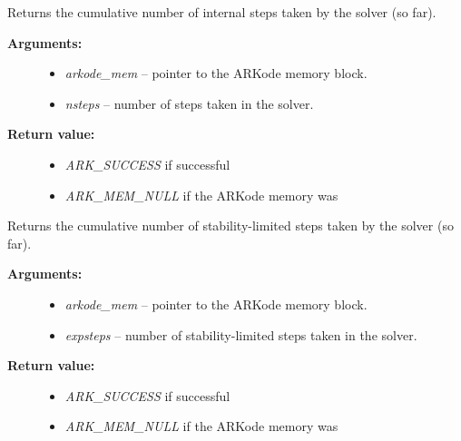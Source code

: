\documentclass[letterpaper,10pt,english]{sphinxmanual}
\begin{document}
\begin{fulllineitems}
\label{c_interface/User_callable:c.ARKodeGetNumSteps}
Returns the cumulative number of internal steps taken by
the solver (so far).
\begin{description}
\item[{\textbf{Arguments:}}] \leavevmode\begin{itemize}
\item {} 
\emph{arkode\_mem} -- pointer to the ARKode memory block.

\item {} 
\emph{nsteps} -- number of steps taken in the solver.

\end{itemize}

\item[{\textbf{Return value:}}] \leavevmode\begin{itemize}
\item {} 
\emph{ARK\_SUCCESS} if successful

\item {} 
\emph{ARK\_MEM\_NULL} if the ARKode memory was 

\end{itemize}

\end{description}

\end{fulllineitems}


\begin{fulllineitems}
\label{c_interface/User_callable:c.ARKodeGetNumExpSteps}
Returns the cumulative number of stability-limited steps
taken by the solver (so far).
\begin{description}
\item[{\textbf{Arguments:}}] \leavevmode\begin{itemize}
\item {} 
\emph{arkode\_mem} -- pointer to the ARKode memory block.

\item {} 
\emph{expsteps} -- number of stability-limited steps taken in the solver.

\end{itemize}

\item[{\textbf{Return value:}}] \leavevmode\begin{itemize}
\item {} 
\emph{ARK\_SUCCESS} if successful

\item {} 
\emph{ARK\_MEM\_NULL} if the ARKode memory was 

\end{itemize}

\end{description}

\end{fulllineitems}
\end{document}
